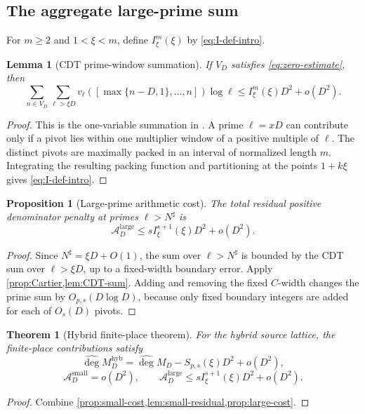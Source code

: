 \documentclass[11pt]{article}
\newtheorem{theorem}{Theorem}[section]
\newtheorem{proposition}[proposition]{Proposition}
\newtheorem{lemma}[lemma]{Lemma}
\theoremstyle{definition}
\theoremstyle{remark}
\newcommand{\widehatdeg}{\widehat{\deg}}
\begin{document}
\subsection{The aggregate large-prime sum}

For $m\ge2$ and $1<\xi<m$, define $I^m_\xi(\xi)$ by
\eqref{eq:I-def-intro}.

\begin{lemma}[CDT prime-window summation]\label{lem:CDT-sum}
If $V_D$ satisfies \eqref{eq:zero-estimate}, then
\[
 \sum_{n\in V_D}\sum_{\ell>\xi D}
 v_\ell([\max\{n-D,1\},\ldots,n])\log\ell
 \le I^m_\xi(\xi)D^2+o(D^2).
\]
\end{lemma}

\begin{proof}
This is the one-variable summation in \cite[Section~7.3]{CDT2024}.  A prime
$\ell=xD$ can contribute only if a pivot lies within one multiplier window of
a positive multiple of $\ell$.  The distinct pivots are maximally packed in
an interval of normalized length $m$.  Integrating the resulting packing
function and partitioning at the points $1+k\xi$ gives
\eqref{eq:I-def-intro}.
\end{proof}

\begin{proposition}[Large-prime arithmetic cost]\label{prop:large-cost}
The total residual positive denominator penalty at primes $\ell>N^\sharp$ is
\[
 \mathscr A_D^{\mathrm{large}}
 \le sI^{s+1}_\xi(\xi)D^2+o(D^2).
\]
\end{proposition}

\begin{proof}
Since $N^\sharp=\xi D+O(1)$, the sum over $\ell>N^\sharp$ is bounded
by the CDT sum over $\ell>\xi D$, up to a fixed-width boundary error.
Apply \cref{prop:Cartier,lem:CDT-sum}.  Adding and removing the fixed
$C$-width changes the prime sum by $O_{p,s}(D\log D)$, because only fixed
boundary integers are added for each of $O_s(D)$ pivots.
\end{proof}

\begin{theorem}[Hybrid finite-place theorem]\label{thm:hybrid-local}
For the hybrid source lattice, the finite-place contributions satisfy
\[
 \widehatdeg M_D^{\mathrm{hyb}}
 =\widehatdeg M_D-S_{p,s}(\xi)D^2+o(D^2),
\]
\[
 \mathscr A_D^{\mathrm{small}}=o(D^2),
 \qquad
 \mathscr A_D^{\mathrm{large}}
 \le sI^{s+1}_\xi(\xi)D^2+o(D^2).
\]
\end{theorem}

\begin{proof}
Combine \cref{prop:small-cost,lem:small-residual,prop:large-cost}.
\end{proof}
\end{document}
